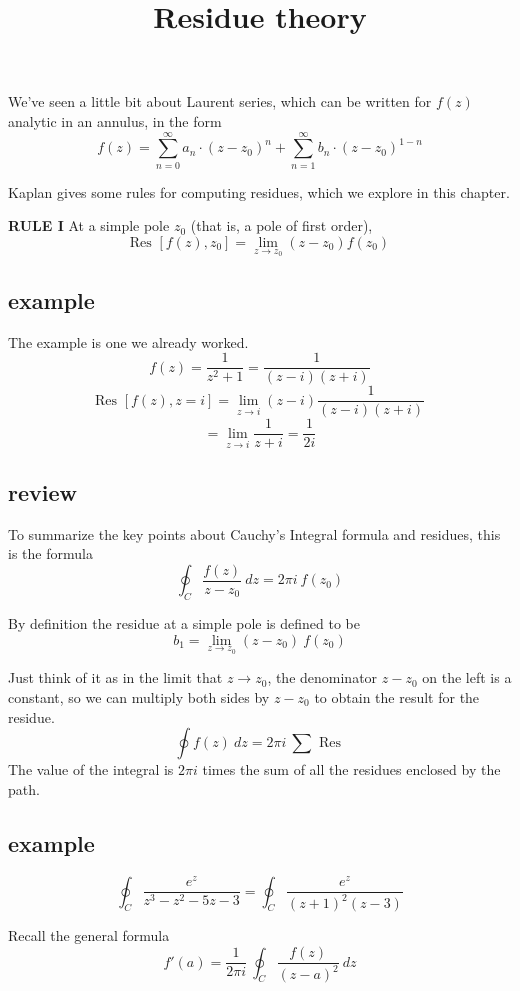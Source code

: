 \documentclass[11pt, oneside]{article}
\title{Residue theory}
\date{}
\begin{document}
\maketitle
\Large


We've seen a little bit about Laurent series, which can be written for $f(z)$ analytic in an annulus, in the form
\[ f(z) = \sum_{n=0}^{\infty} a_n \cdot (z-z_0)^n + \sum_{n=1}^{\infty} b_{n} \cdot (z-z_0)^{1-n} \]

Kaplan gives some rules for computing residues, which we explore in this chapter.

\textbf{RULE I}  At a simple pole $z_0$ (that is, a pole of first order),
\[ \text{Res } [f(z),z_0] = \lim_{z \rightarrow z_0} (z-z_0) f(z_0) \]

\subsection*{example}
The example is one we already worked.
\[ f(z) = \frac{1}{z^2 + 1} = \frac{1}{(z - i)(z + i)} \]
\[ \text{Res } [f(z),z=i] = \lim_{z \rightarrow i} (z-i) \frac{1}{(z - i)(z + i)} \]
\[ = \lim_{z \rightarrow i} \frac{1}{z + i} = \frac{1}{2i} \]

\subsection*{review}

To summarize the key points about Cauchy's Integral formula and residues, this is the formula
\[ \oint_C \frac{f(z)}{z - z_0} \ dz = 2 \pi i \ f(z_0) \]

By definition the residue at a simple pole is defined to be
\[ b_1 = \lim_{z \rightarrow z_0} (z-z_0) \ f(z_0)  \]

Just think of it as in the limit that $z \rightarrow z_0$, the denominator $z-z_0$ on the left is a constant, so we can multiply both sides by $z - z_0$ to obtain the result for the residue.
\[ \oint f(z) \ dz = 2 \pi i \ \sum \text{ Res } \]
The value of the integral is $2 \pi i$ times the sum of all the residues enclosed by the path.

\subsection*{example}
\[ \oint_C \frac{e^z}{z^3 - z^2 - 5z - 3} = \oint_C \frac{e^z}{(z+1)^2 (z-3)} \]

Recall the general formula
\[ f'(a) = \frac{1}{2 \pi i} \ \oint_C \frac{f(z)}{(z-a)^2} \ dz \]
\end{document}
